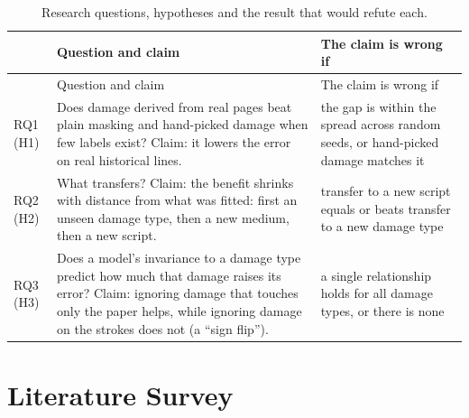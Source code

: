 \documentclass[
  12pt,
  a4paper,
]{report}
\newcounter{none} %
\begin{document}
\begin{longtable}[]{@{}
  >{\raggedright\arraybackslash}p{}
  >{\raggedright\arraybackslash}p{}
  >{\raggedright\arraybackslash}p{}@{}}
\caption{Research questions, hypotheses and the result that would refute
each.}\tabularnewline
\toprule\noalign{}
\begin{minipage}[b]{\linewidth}\raggedright
\end{minipage} & \begin{minipage}[b]{\linewidth}\raggedright
Question and claim
\end{minipage} & \begin{minipage}[b]{\linewidth}\raggedright
The claim is wrong if
\end{minipage} \\
\midrule\noalign{}
\endfirsthead
\toprule\noalign{}
\begin{minipage}[b]{\linewidth}\raggedright
\end{minipage} & \begin{minipage}[b]{\linewidth}\raggedright
Question and claim
\end{minipage} & \begin{minipage}[b]{\linewidth}\raggedright
The claim is wrong if
\end{minipage} \\
\midrule\noalign{}
\endhead
\bottomrule\noalign{}
\endlastfoot
RQ1 (H1) & Does damage derived from real pages beat plain masking and
hand-picked damage when few labels exist? Claim: it lowers the error on
real historical lines. & the gap is within the spread across random
seeds, or hand-picked damage matches it \\
RQ2 (H2) & What transfers? Claim: the benefit shrinks with distance from
what was fitted: first an unseen damage type, then a new medium, then a
new script. & transfer to a new script equals or beats transfer to a new
damage type \\
RQ3 (H3) & Does a model's invariance to a damage type predict how much
that damage raises its error? Claim: ignoring damage that touches only
the paper helps, while ignoring damage on the strokes does not (a ``sign
flip''). & a single relationship holds for all damage types, or there is
none \\
\end{longtable}

\chapter{Literature Survey}\label{literature-survey}
\end{document}
